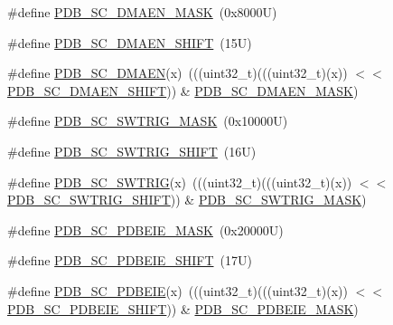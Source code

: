 \begin{DoxyCompactItemize}
\item 
\#define \mbox{\hyperlink{group___p_d_b___register___masks_gae2e04f313df4593c36890e463071fe5b}{P\+D\+B\+\_\+\+S\+C\+\_\+\+D\+M\+A\+E\+N\+\_\+\+M\+A\+SK}}~(0x8000\+U)
\item 
\#define \mbox{\hyperlink{group___p_d_b___register___masks_ga06b0f6651787dda98baf8953321b101b}{P\+D\+B\+\_\+\+S\+C\+\_\+\+D\+M\+A\+E\+N\+\_\+\+S\+H\+I\+FT}}~(15\+U)
\item 
\#define \mbox{\hyperlink{group___p_d_b___register___masks_gaf59f2858467f2c5e5d3a7fb6ec275db1}{P\+D\+B\+\_\+\+S\+C\+\_\+\+D\+M\+A\+EN}}(x)~(((uint32\+\_\+t)(((uint32\+\_\+t)(x)) $<$$<$ \mbox{\hyperlink{group___p_d_b___register___masks_ga06b0f6651787dda98baf8953321b101b}{P\+D\+B\+\_\+\+S\+C\+\_\+\+D\+M\+A\+E\+N\+\_\+\+S\+H\+I\+FT}})) \& \mbox{\hyperlink{group___p_d_b___register___masks_gae2e04f313df4593c36890e463071fe5b}{P\+D\+B\+\_\+\+S\+C\+\_\+\+D\+M\+A\+E\+N\+\_\+\+M\+A\+SK}})
\item 
\#define \mbox{\hyperlink{group___p_d_b___register___masks_gaee37e4f669c308f1bfa17462ccbdc44b}{P\+D\+B\+\_\+\+S\+C\+\_\+\+S\+W\+T\+R\+I\+G\+\_\+\+M\+A\+SK}}~(0x10000\+U)
\item 
\#define \mbox{\hyperlink{group___p_d_b___register___masks_ga494cf2eed3e90d588c9d6a79cdb5aaaa}{P\+D\+B\+\_\+\+S\+C\+\_\+\+S\+W\+T\+R\+I\+G\+\_\+\+S\+H\+I\+FT}}~(16\+U)
\item 
\#define \mbox{\hyperlink{group___p_d_b___register___masks_ga3115020e410ff99d5a7c5752cacfa394}{P\+D\+B\+\_\+\+S\+C\+\_\+\+S\+W\+T\+R\+IG}}(x)~(((uint32\+\_\+t)(((uint32\+\_\+t)(x)) $<$$<$ \mbox{\hyperlink{group___p_d_b___register___masks_ga494cf2eed3e90d588c9d6a79cdb5aaaa}{P\+D\+B\+\_\+\+S\+C\+\_\+\+S\+W\+T\+R\+I\+G\+\_\+\+S\+H\+I\+FT}})) \& \mbox{\hyperlink{group___p_d_b___register___masks_gaee37e4f669c308f1bfa17462ccbdc44b}{P\+D\+B\+\_\+\+S\+C\+\_\+\+S\+W\+T\+R\+I\+G\+\_\+\+M\+A\+SK}})
\item 
\#define \mbox{\hyperlink{group___p_d_b___register___masks_gadad9b8b56988b977ed415ab18985f9dc}{P\+D\+B\+\_\+\+S\+C\+\_\+\+P\+D\+B\+E\+I\+E\+\_\+\+M\+A\+SK}}~(0x20000\+U)
\item 
\#define \mbox{\hyperlink{group___p_d_b___register___masks_gaa64d610e568a9cafe7d2110a76daf8df}{P\+D\+B\+\_\+\+S\+C\+\_\+\+P\+D\+B\+E\+I\+E\+\_\+\+S\+H\+I\+FT}}~(17\+U)
\item 
\#define \mbox{\hyperlink{group___p_d_b___register___masks_ga312af2bced4144186dd31b9f92ef2f8b}{P\+D\+B\+\_\+\+S\+C\+\_\+\+P\+D\+B\+E\+IE}}(x)~(((uint32\+\_\+t)(((uint32\+\_\+t)(x)) $<$$<$ \mbox{\hyperlink{group___p_d_b___register___masks_gaa64d610e568a9cafe7d2110a76daf8df}{P\+D\+B\+\_\+\+S\+C\+\_\+\+P\+D\+B\+E\+I\+E\+\_\+\+S\+H\+I\+FT}})) \& \mbox{\hyperlink{group___p_d_b___register___masks_gadad9b8b56988b977ed415ab18985f9dc}{P\+D\+B\+\_\+\+S\+C\+\_\+\+P\+D\+B\+E\+I\+E\+\_\+\+M\+A\+SK}})
$$
\end{DoxyCompactItemize}
